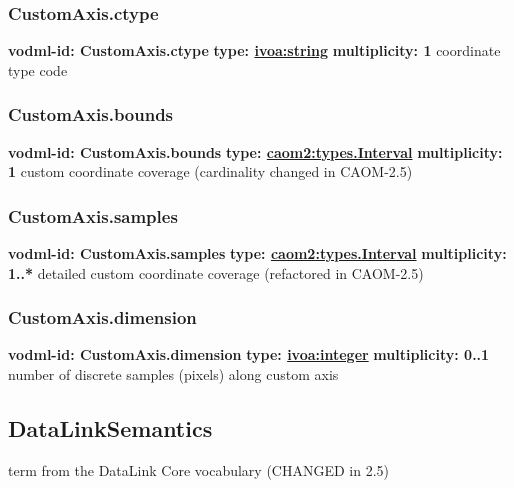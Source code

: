     \subsubsection{CustomAxis.ctype}
      \textbf{vodml-id: CustomAxis.ctype} \newline
      \textbf{type: \hyperref[sect:ivoa]{ivoa:string}} \newline
      \textbf{multiplicity: 1} \newline
      coordinate type code

    \subsubsection{CustomAxis.bounds}
      \textbf{vodml-id: CustomAxis.bounds} \newline
      \textbf{type: \hyperref[sect:types.Interval]{caom2:types.Interval}} \newline
      \textbf{multiplicity: 1} \newline
      custom coordinate coverage (cardinality changed in CAOM-2.5)

    \subsubsection{CustomAxis.samples}
      \textbf{vodml-id: CustomAxis.samples} \newline
      \textbf{type: \hyperref[sect:types.Interval]{caom2:types.Interval}} \newline
      \textbf{multiplicity: 1..*} \newline
      detailed custom coordinate coverage (refactored in CAOM-2.5)

    \subsubsection{CustomAxis.dimension}
      \textbf{vodml-id: CustomAxis.dimension} \newline
      \textbf{type: \hyperref[sect:ivoa]{ivoa:integer}} \newline
      \textbf{multiplicity: 0..1} \newline
      number of discrete samples (pixels) along custom axis

  \subsection{DataLinkSemantics}
  \label{sect:DataLinkSemantics}
    term from the DataLink Core vocabulary (CHANGED in 2.5)

